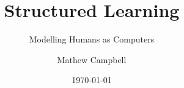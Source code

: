 \documentclass[a4paper]{report}
\title{Structured Learning}
\subtitle{Modelling Humans as Computers}
\author{Mathew Campbell}
\date{\today}
\begin{document}
  \makeTYPTitle

  

  \tableofcontents

  
  
  
  
  
  
  
  

  

  \begin{appendices}
    
    
  \end{appendices}
\end{document}
